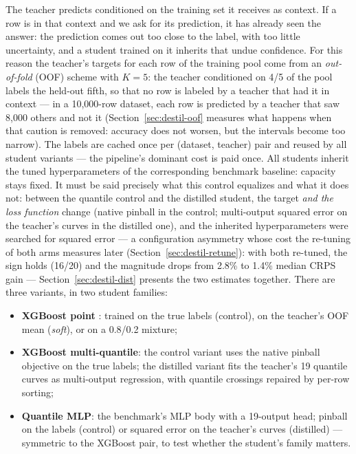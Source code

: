The teacher predicts conditioned on the training set it receives as
context. If a row is in that context and we ask for its prediction,
it has already seen the answer: the prediction comes out too close
to the label, with too little uncertainty, and a student trained on
it inherits that undue confidence. For this reason the teacher's
targets for each row of the training pool come from an
\emph{out-of-fold} (OOF) scheme with $K{=}5$: the teacher
conditioned on 4/5 of the pool labels the held-out fifth, so that no
row is labeled by a teacher that had it in context --- in a
10{,}000-row dataset, each row is predicted by a teacher that saw
8{,}000 others and not it (Section~\ref{sec:destil-oof} measures
what happens when that caution is removed: accuracy does not worsen,
but the intervals become too narrow). The labels are cached once per
(dataset, teacher) pair and reused by all student variants --- the
pipeline's dominant cost is paid once. All students inherit the
tuned hyperparameters of the corresponding benchmark baseline:
capacity stays fixed. It must be said precisely what this control
equalizes and what it does not: between the quantile control and the
distilled student, the target \emph{and the loss function} change
(native pinball in the control; multi-output squared error on the
teacher's curves in the distilled one), and the inherited
hyperparameters were searched for squared error --- a configuration
asymmetry whose cost the re-tuning of both arms measures later
(Section~\ref{sec:destil-retune}): with both re-tuned, the sign
holds (16/20) and the magnitude drops from 2.8\% to 1.4\% median
CRPS gain --- Section~\ref{sec:destil-dist} presents the two
estimates together. There are three variants, in two student
families:

\begin{itemize}
  \item \textbf{XGBoost point} \citep{chen2016}: trained on the true
    labels (control), on the teacher's OOF mean (\emph{soft}), or on
    a 0.8/0.2 mixture;
  \item \textbf{XGBoost multi-quantile}: the control variant uses
    the native pinball objective \citep{koenker1978} on the true
    labels; the distilled variant fits the teacher's 19 quantile
    curves as multi-output regression, with quantile crossings
    repaired by per-row sorting;
  \item \textbf{Quantile MLP}: the benchmark's MLP body with a
    19-output head; pinball on the labels (control) or squared error
    on the teacher's curves (distilled) --- symmetric to the XGBoost
    pair, to test whether the student's family matters.
\end{itemize}

